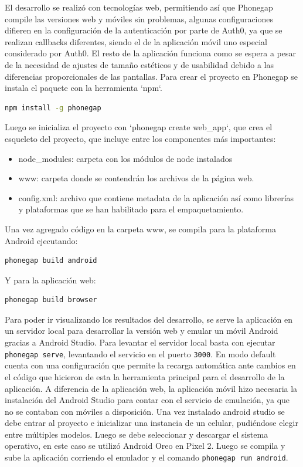 El desarrollo se realizó con tecnologías web, permitiendo así que Phonegap compile las versiones web y móviles sin problemas, algunas configuraciones difieren en la configuración de la autenticación por parte de Auth0, ya que se realizan callbacks diferentes, siendo el de la aplicación móvil uno especial considerado por Auth0.
El resto de la aplicación funciona como se espera a pesar de la necesidad de ajustes de tamaño estéticos y de usabilidad debido a las diferencias proporcionales de las pantallas.
Para crear el proyecto en Phonegap se instala el paquete con la herramienta `npm`.

\begin{lstlisting}[language=bash]
  npm install -g phonegap
\end{lstlisting}

Luego se inicializa el proyecto con `phonegap create web\_app`, que crea el esqueleto del proyecto, que incluye entre los componentes más importantes: 
\begin{itemize}
  \item node\_modules: carpeta con los módulos de node instalados
  \item www: carpeta donde se contendrán los archivos de la página web.
  \item config.xml: archivo que contiene metadata de la aplicación así como librerías y plataformas que se han habilitado para el empaquetamiento.
\end{itemize}

Una vez agregado código en la carpeta www, se compila para la plataforma Android ejecutando:

\begin{lstlisting}[language=bash]
  phonegap build android
\end{lstlisting}

Y para la aplicación web:

\begin{lstlisting}[language=bash]
  phonegap build browser
\end{lstlisting}

Para poder ir visualizando los resultados del desarrollo, se serve la aplicación en un servidor local para desarrollar la versión web y emular un móvil Android gracias a Android Studio. 
Para levantar el servidor local basta con ejecutar \lstinline[columns=fixed]{phonegap serve}, levantando el servicio en el puerto \lstinline[columns=fixed]{3000}. En modo default cuenta con una configuración que permite la recarga automática ante cambios en el código que hicieron de esta la herramienta principal para el desarrollo de la aplicación.
A diferencia de la aplicación web, la aplicación móvil hizo necesaria la instalación del Android Studio para contar con el servicio de emulación, ya que no se contaban con móviles a disposición. Una vez instalado android studio se debe entrar al proyecto e inicializar una instancia de un celular, pudiéndose elegir entre múltiples modelos. Luego se debe seleccionar y descargar el sistema operativo, en este caso se utilizó Android Oreo en Pixel 2.
Luego se compila y sube la aplicación corriendo el emulador y el comando \lstinline[columns=fixed]{phonegap run android}.

